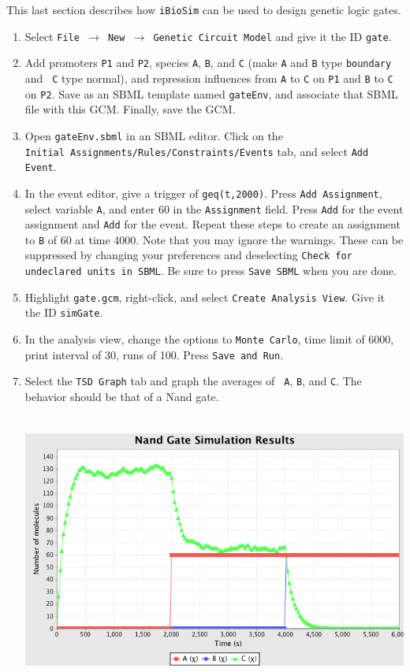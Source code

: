 \documentclass[titlepage,11pt]{article}
\begin{document}
This last section describes how {\tt iBioSim} can be used to design
genetic logic gates.
\begin{enumerate}
\item Select {\tt File $\rightarrow$ New $\rightarrow$ Genetic Circuit
    Model} and give it the ID {\tt gate}.
\item Add promoters {\tt P1} and {\tt P2}, species {\tt A}, {\tt B},
  and {\tt C} (make {\tt A} and {\tt B} type {\tt boundary} and {\tt
    C} type normal), and repression influences from {\tt A} to {\tt C} on
  {\tt P1} and {\tt B} to {\tt C} on {\tt P2}.  Save as an SBML
  template named {\tt gateEnv}, and associate that SBML file with this
  GCM.  Finally, save the GCM.
\item Open {\tt gateEnv.sbml} in an SBML editor.  Click on the\\ 
      {\tt Initial Assignments/Rules/Constraints/Events} tab, and
      select {\tt Add Event}.
\item In the event editor, give a trigger of {\tt geq(t,2000)}.   
      Press {\tt Add Assignment}, select variable {\tt A}, and enter
      60 in the {\tt Assignment} field.  Press {\tt Add} for the event
      assignment and {\tt Add} for the event.  Repeat these steps to
      create an assignment to {\tt B} of 60 at time 4000.  Note that
      you may ignore the warnings.  These can be suppressed by
      changing your preferences and deselecting {\tt Check for
        undeclared units in SBML}.  Be sure to press {\tt Save SBML}
      when you are done.
\item Highlight {\tt gate.gcm}, right-click, and select {\tt Create
    Analysis View}.  Give it the ID {\tt simGate}.
\item In the analysis view, change the options to 
      {\tt Monte Carlo}, time limit of 6000, print interval of 30,
      runs of 100.  
      Press {\tt Save and Run}.
\item Select the {\tt TSD Graph} tab and graph the averages of {\tt
    A},  {\tt B}, and {\tt C}.  The behavior should be that of a Nand
  gate.

\includegraphics[height=90mm]{screenshots/nandResults}


\end{enumerate}
\end{document}
